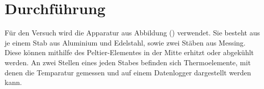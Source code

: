 \section{Durchführung}
Für den Versuch wird die Apparatur aus Abbildung () verwendet. Sie besteht aus je einem Stab aus Aluminium und Edelstahl, sowie zwei Stäben aus Messing. Diese können mithilfe des Peltier-Elementes in der Mitte erhitzt oder abgekühlt werden. An zwei Stellen eines jeden Stabes befinden sich Thermoelemente, mit denen 
die Temparatur gemessen und auf einem Datenlogger dargestellt werden kann.
